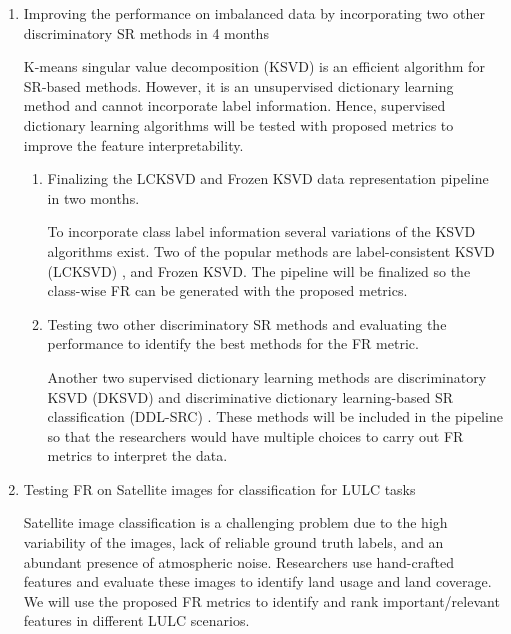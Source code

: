 \documentclass[11pt]{article}
\begin{document}
\begin{enumerate}
\begin{enumerate}
    \end{enumerate}
    
    \item Improving the performance on imbalanced data by incorporating two other discriminatory SR methods in 4 months
    
    K-means singular value decomposition (KSVD)\cite{Aharon2006} is an efficient algorithm for SR-based methods. However, it is an unsupervised dictionary learning method and cannot incorporate label information. Hence, supervised dictionary learning algorithms will be tested with proposed metrics to improve the feature interpretability.
    
    \begin{enumerate}
    
        \item Finalizing the LCKSVD and Frozen KSVD data representation pipeline in two months.
        
        To incorporate class label information several variations of the KSVD algorithms exist. Two of the popular methods are label-consistent KSVD (LCKSVD) \cite{Jiang2011}, and Frozen KSVD\cite{Carroll2017}. The pipeline will be finalized so the class-wise FR can be generated with the proposed metrics. 
        
        \item Testing two other discriminatory SR methods and evaluating the performance to identify the best methods for the FR metric.
        
        Another two supervised dictionary learning methods are discriminatory KSVD (DKSVD) \cite{Zhang2010} and discriminative dictionary learning-based SR classification (DDL-SRC) \cite{Kong2021}. These methods will be included in the pipeline so that the researchers would have multiple choices to carry out FR metrics to interpret the data.
        
    \end{enumerate}
    
    \item Testing FR on Satellite images for classification for LULC tasks
    
    Satellite image classification is a challenging problem due to the high variability of the images, lack of reliable ground truth labels, and an abundant presence of atmospheric noise. Researchers use hand-crafted features and evaluate these images to identify land usage and land coverage. We will use the proposed FR metrics to identify and rank important/relevant features in different LULC scenarios. 
    

\end{enumerate}
\end{document}
